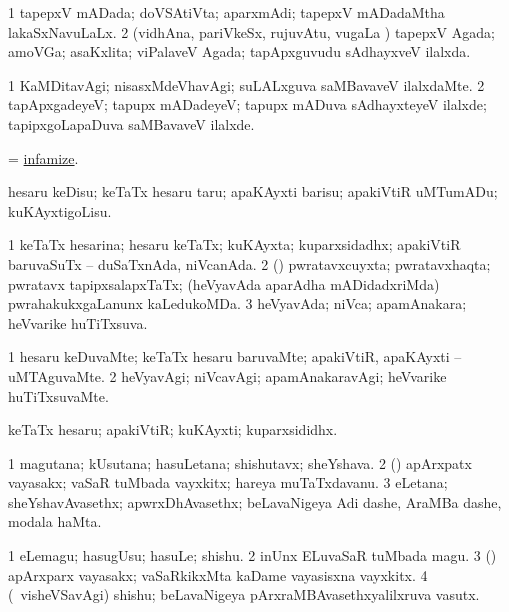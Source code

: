 \bentry
{}
\gl{\gu}
\bmng
\bnum
\num{1} tapepxV mADada; doVSAtiVta; aparxmAdi; tapepxV mADadaMtha lakaSxNavuLaLx. 
\num{2} (vidhAna, pariVkeSx, rujuvAtu, \mo vugaLa \vi) tapepxV Agada; amoVGa; asaKxlita; viPalaveV Agada; tapApxguvudu sAdhayxveV ilalxda. 
\enum
\emng
\eentry

\bentry
{}
\gl{\kirxvi}
\bmng
\bnum
\num{1} KaMDitavAgi; nisasxMdeVhavAgi; suLALxguva saMBavaveV ilalxdaMte. 
\num{2} tapApxgadeyeV; tapupx mADadeyeV; tapupx mADuva sAdhayxteyeV ilalxde; tapipxgoLapaDuva saMBavaveV ilalxde. 
\enum
\emng
\eentry

\bentry
{}
\gl{\sakirx}
\bmng
 = \hyperlink{infamize}{infamize}. 
\emng
\eentry

\bentry
{}
\gl{\sakirx}
\bmng
hesaru keDisu; keTaTx hesaru taru; apaKAyxti barisu; apakiVtiR uMTumADu; kuKAyxtigoLisu. 
\emng
\eentry

\bentry
{}
\gl{\gu}
\bmng
\bnum
\num{1} keTaTx hesarina; hesaru keTaTx; kuKAyxta; kuparxsidadhx; apakiVtiR baruvaSuTx -- duSaTxnAda, niVcanAda. 
\num{2} (\nAyxshA) pwratavxcuyxta; pwratavxhaqta; pwratavx tapipxsalapxTaTx; (heVyavAda aparAdha mADidadxriMda) pwrahakukxgaLanunx kaLedukoMDa. 
\num{3} heVyavAda; niVca; apamAnakara; heVvarike huTiTxsuva. 
\enum
\emng
\eentry

\bentry
{}
\gl{\kirxvi}
\bmng
\bnum
\num{1} hesaru keDuvaMte; keTaTx hesaru baruvaMte; apakiVtiR, apaKAyxti -- uMTAguvaMte. 
\num{2} heVyavAgi; niVcavAgi; apamAnakaravAgi; heVvarike huTiTxsuvaMte. 
\enum
\emng
\eentry

\bentry
{}
\gl{\nA}
\bmng
keTaTx hesaru; apakiVtiR; kuKAyxti; kuparxsididhx. 
\emng
\eentry

\bentry
{}
\gl{\nA}
\bmng
\bnum
\num{1} magutana; kUsutana; hasuLetana; shishutavx; sheYshava. 
\num{2} (\nAyxshA) apArxpatx vayasakx;  vaSaR tuMbada vayxkitx; hareya muTaTxdavanu. 
\num{3} eLetana; sheYshavAvasethx; apwrxDhAvasethx; beLavaNigeya Adi dashe, AraMBa dashe, modala haMta. 
\enum
\emng
\eentry

\bentry
{}
\gl{\nA}
\bmng
\bnum
\num{1} eLemagu; hasugUsu; hasuLe; shishu. 
\num{2} inUnx ELuvaSaR tuMbada magu. 
\num{3} (\nAyxshA) apArxparx vayasakx;  vaSaRkikxMta kaDame vayasisxna vayxkitx. 
\num{4} (\kanmu\ visheVSavAgi) shishu; beLavaNigeya pArxraMBAvasethxyalilxruva vasutx. 
\enum
\emng
\eentry

